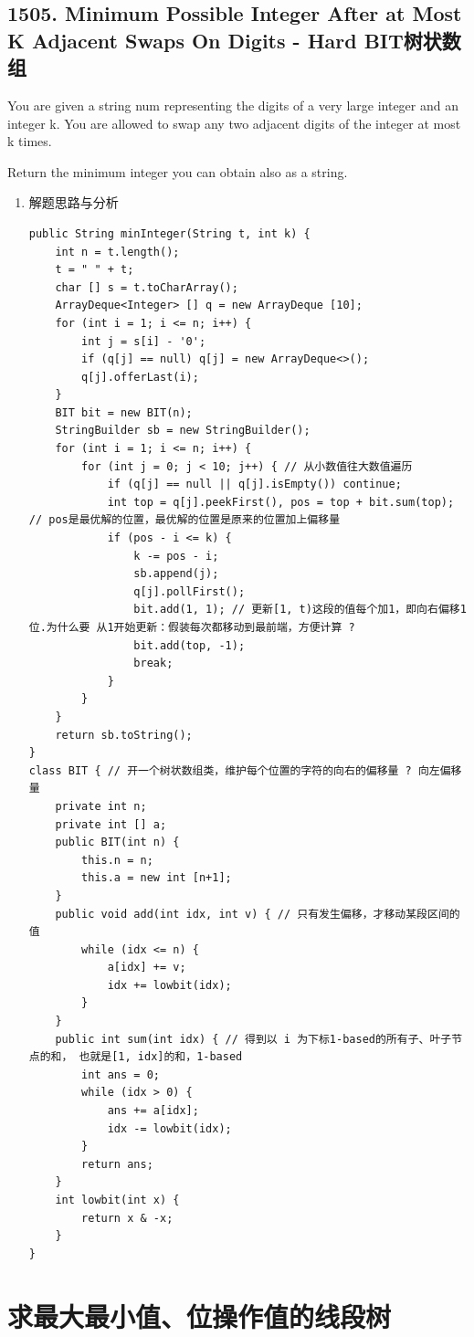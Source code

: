 \documentclass[9pt, b5paaper]{book}
\begin{document}
\subsection{1505. Minimum Possible Integer After at Most K Adjacent Swaps On Digits - Hard BIT树状数组}
\label{sec-1-1-8}
You are given a string num representing the digits of a very large integer and an integer k. You are allowed to swap any two adjacent digits of the integer at most k times.

Return the minimum integer you can obtain also as a string.
\begin{enumerate}
\item 解题思路与分析
\label{sec-1-1-8-1}
\begin{verbatim}
public String minInteger(String t, int k) {
    int n = t.length();
    t = " " + t;
    char [] s = t.toCharArray();
    ArrayDeque<Integer> [] q = new ArrayDeque [10];
    for (int i = 1; i <= n; i++) {
        int j = s[i] - '0';
        if (q[j] == null) q[j] = new ArrayDeque<>();
        q[j].offerLast(i);
    }
    BIT bit = new BIT(n);
    StringBuilder sb = new StringBuilder();
    for (int i = 1; i <= n; i++) {
        for (int j = 0; j < 10; j++) { // 从小数值往大数值遍历
            if (q[j] == null || q[j].isEmpty()) continue;
            int top = q[j].peekFirst(), pos = top + bit.sum(top); // pos是最优解的位置，最优解的位置是原来的位置加上偏移量
            if (pos - i <= k) {
                k -= pos - i;
                sb.append(j);
                q[j].pollFirst();
                bit.add(1, 1); // 更新[1, t)这段的值每个加1，即向右偏移1位.为什么要 从1开始更新：假装每次都移动到最前端，方便计算 ?
                bit.add(top, -1);
                break;
            }
        }
    }
    return sb.toString();
}
class BIT { // 开一个树状数组类，维护每个位置的字符的向右的偏移量 ? 向左偏移量
    private int n;
    private int [] a;
    public BIT(int n) {
        this.n = n;
        this.a = new int [n+1];
    }
    public void add(int idx, int v) { // 只有发生偏移，才移动某段区间的值
        while (idx <= n) {
            a[idx] += v;
            idx += lowbit(idx);
        }
    }
    public int sum(int idx) { // 得到以 i 为下标1-based的所有子、叶子节点的和， 也就是[1, idx]的和，1-based
        int ans = 0;
        while (idx > 0) {
            ans += a[idx];
            idx -= lowbit(idx);
        }
        return ans;
    }
    int lowbit(int x) {
        return x & -x;
    }
}
\end{verbatim}
\end{enumerate}

\section{求最大最小值、位操作值的线段树}
\label{sec-1-2}
\end{document}
